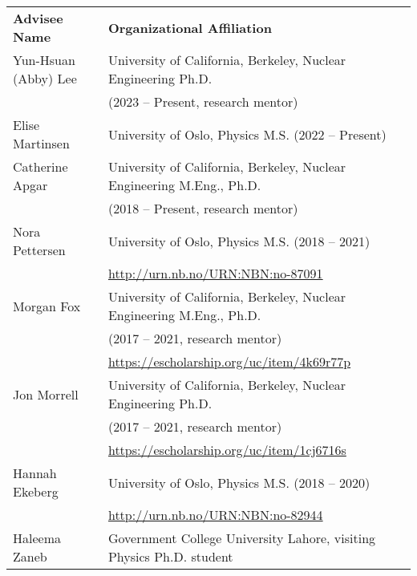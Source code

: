 \begin{longtable}{ @{} l @{\hspace{6ex}} l }
\bf{Advisee Name}   &  \bf{Organizational Affiliation}\\

Yun-Hsuan (Abby) Lee & University of California, Berkeley, Nuclear Engineering Ph.D. \\ & (2023 -- Present, research mentor)\\
Elise Martinsen & University of Oslo, Physics M.S. (2022 -- Present)\\
Catherine  Apgar & University of California, Berkeley, Nuclear Engineering M.Eng., Ph.D. \\ & (2018 -- Present, research mentor)\\
Nora Pettersen & University of Oslo, Physics M.S. (2018 -- 2021)\\
               & \url{http://urn.nb.no/URN:NBN:no-87091}\vspace{0.5mm}\\
Morgan  Fox & University of California, Berkeley, Nuclear Engineering M.Eng., Ph.D. \\ & (2017 -- 2021, research mentor)\\
                & \url{https://escholarship.org/uc/item/4k69r77p}\vspace{0.5mm}\\               
Jon  Morrell & University of California, Berkeley, Nuclear Engineering Ph.D. \\ & (2017 -- 2021, research mentor)\\
                & \url{https://escholarship.org/uc/item/1cj6716s}\vspace{0.5mm}\\
Hannah Ekeberg & University of Oslo, Physics M.S. (2018 -- 2020)\\
               & \url{http://urn.nb.no/URN:NBN:no-82944}\vspace{0.5mm}\\
Haleema Zaneb  & Government College University Lahore,
visiting Physics Ph.D. student\\ 

\end{longtable}
